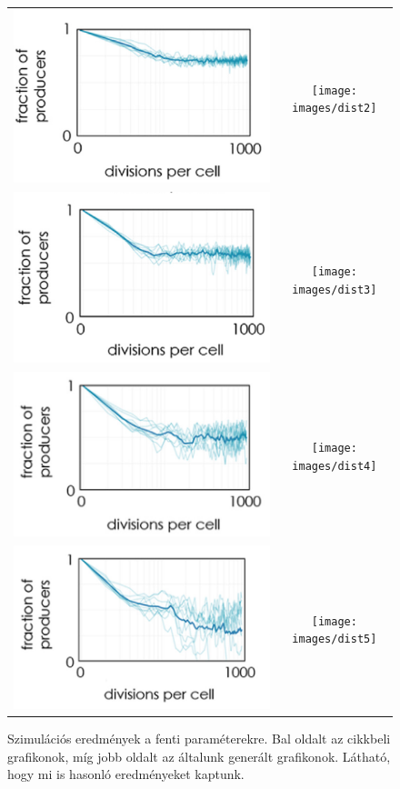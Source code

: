 \begin{figure}[ht!]
	\centering
	\begin{tabular}{cc}
		\includegraphics[width=0.47\linewidth]{images/arc_dist2}
		&
		\texttt{[image: images/dist2]}
		\\
		\includegraphics[width=0.47\linewidth]{images/arc_dist3}
		&
		\texttt{[image: images/dist3]}
		\\
		\includegraphics[width=0.47\linewidth]{images/arc_dist4}
		&
		\texttt{[image: images/dist4]}
		\\
		\includegraphics[width=0.47\linewidth]{images/arc_dist5}
		&
		\texttt{[image: images/dist5]}
		\\
	\end{tabular}
	\caption{Szimulációs eredmények a fenti paraméterekre. Bal oldalt az \cite{archetti2016cooperation} cikkbeli grafikonok, míg jobb oldalt az általunk generált grafikonok. Látható, hogy mi is hasonló eredményeket kaptunk.}
	\label{fig:DistChange}
\end{figure}


